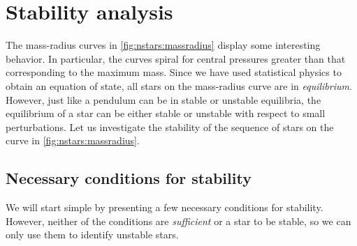 \section{Stability analysis}

The mass-radius curves in \cref{fig:nstars:massradius} display some interesting behavior.
In particular, the curves spiral for central pressures greater than that corresponding to the maximum mass.
Since we have used statistical physics to obtain an equation of state, all stars on the mass-radius curve are in \emph{equilibrium}.
However, just like a pendulum can be in stable or unstable equilibria, the equilibrium of a star can be either stable or unstable with respect to small perturbations.
Let us investigate the stability of the sequence of stars on the curve in \cref{fig:nstars:massradius}.


\subsection{Necessary conditions for stability}

We will start simple by presenting a few necessary conditions for stability.
However, neither of the conditions are \emph{sufficient} or a star to be stable, so we can only use them to identify unstable stars.

